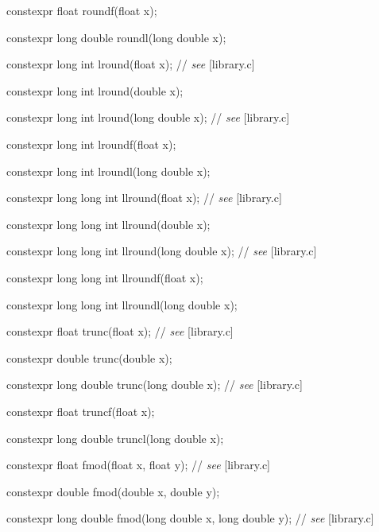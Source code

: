\documentclass[prd,twocolumn,amsmath,amssymb,nofootinbib,eqsecnum]{revtex4-1}
\newcommand{\oldhighlight}[1]{{\color{green} #1}}
\newcommand{\stdcomment}[1]{{// {\it see} [#1]}}
\begin{document}
{\oldhighlight{constexpr} float roundf(float x);

\oldhighlight{constexpr} long double roundl(long double x);

\vspace{2ex}


\oldhighlight{constexpr} long int lround(float x); \stdcomment{library.c}

\oldhighlight{constexpr} long int lround(double x);

\oldhighlight{constexpr} long int lround(long double x); \stdcomment{library.c}

\oldhighlight{constexpr} long int lroundf(float x);

\oldhighlight{constexpr} long int lroundl(long double x);

\vspace{2ex}


\oldhighlight{constexpr} long long int llround(float x); \stdcomment{library.c}

\oldhighlight{constexpr} long long int llround(double x);

\oldhighlight{constexpr} long long int llround(long double x); \stdcomment{library.c}

\oldhighlight{constexpr} long long int llroundf(float x);

\oldhighlight{constexpr} long long int llroundl(long double x);

\vspace{2ex}


\oldhighlight{constexpr} float trunc(float x); \stdcomment{library.c}

\oldhighlight{constexpr} double trunc(double x);

\oldhighlight{constexpr} long double trunc(long double x); \stdcomment{library.c}

\oldhighlight{constexpr} float truncf(float x);

\oldhighlight{constexpr} long double truncl(long double x);

\vspace{2ex}


\oldhighlight{constexpr} float fmod(float x, float y); \stdcomment{library.c}

\oldhighlight{constexpr} double fmod(double x, double y);

\oldhighlight{constexpr} long double fmod(long double x, long double y); \stdcomment{library.c}

}
\end{document}

